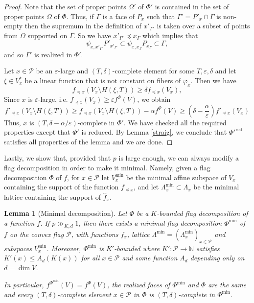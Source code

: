 \documentclass{daj}
\renewcommand{\le}{\leqslant}
\renewcommand{\ge}{\geqslant}
\newcommand{\N}{\mathbb N}
\renewcommand{\P}{\mathcal P}
\newtheorem{lemma}[theorem]{Lemma}
\theoremstyle{definition}
\theoremstyle{remark}
\theoremstyle{definition}
\theoremstyle{definition}
\begin{document}
\begin{proof}
Note that the set of proper points $\Omega'$ of $\Phi'$ is contained in the set of proper points $\Omega$ of $\Phi$. Thus, if $\Gamma$ is a face of $P_x$ such that $\Gamma' = P'_x \cap \Gamma$ is non-empty then the supremum in the definition of $x'_{\Gamma'}$ is taken over a subset of points from $\Omega$ supported on  $\Gamma$. So we have $x'_{\Gamma'} \preceq x_\Gamma$ which implies that
$$
\psi_{x, x'_{\Gamma'}} P'_{x'_{\Gamma'}} \subset \psi_{x, x_\Gamma} P_{x_\Gamma} \subset \Gamma,
$$
and so $\Gamma'$ is realized in $\Phi'$. 

Let $x \in \P$ be an $\varepsilon$-large and $(T, \delta)$-complete element for some $T,\varepsilon, \delta$ and let $\xi \in V_x^*$ be a linear function that is not constant on fibers of $\varphi_x$. Then we have 
$$
f_{\preceq x}(V_x \setminus H(\xi, T)) \ge \delta f_{\preceq x}(V_x),
$$
Since $x$ is $\varepsilon$-large, i.e. $f_{\preceq x}(V_x) \ge \varepsilon f^\Phi(V)$, we obtain
$$
f'_{\preceq x}(V_x \setminus H(\xi, T)) \ge f_{\preceq x}(V_x \setminus H(\xi, T)) - \alpha f^\Phi(V) \ge \left(\delta - \frac{\alpha}{\varepsilon}\right) f'_{\preceq x}(V_x)
$$
Thus, $x$ is $(T, \delta - \alpha/\varepsilon)$-complete in $\Phi'$. We have checked all the required properties except that $\Phi'$ is reduced. By Lemma \ref{straig}, we conclude that $\Phi'^{\text{red}}$ satisfies all properties of the lemma and we are done.
\end{proof}

Lastly, we show that, provided that $p$ is large enough, we can always modify a flag decomposition in order to make it minimal. Namely, given a flag decomposition $\Phi$ of $f$, for $x \in \P$ let $V_x^{\text{min}}$ be the minimal affine subspace of $V_x$ containing the support of the function $f_{\preceq x}$, and let $\Lambda_x^{\text{min}} \subset \Lambda_x$ be the minimal lattice containing the support of $\hat f_x$.

\begin{lemma}[Minimal decomposition]\label{minlat}
Let $\Phi$ be a $K$-bounded flag decomposition of a function $f$. If $p \gg_{K, d}1$, then there exists a minimal flag decomposition $\Phi^{\text{min}}$ of $f$ on the convex flag $\P$, with functions $f_x$, lattice $\Lambda^{\text{min}} = (\Lambda_x^{\text{min}})_{x\in\P}$ and subspaces $V_x^{\text{min}}$. Moreover, $\Phi^{\text{min}}$ is $K'$-bounded where $K': \P\rightarrow \N$ satisfies $K'(x) \le A_d(K(x))$ for all $x \in \P$ and some function $A_d$ depending only on $d = \dim V$.

In particular, $f^{\Phi^{\text{min}}}(V) = f^{\Phi}(V)$, the realized faces of $\Phi^{\text{min}}$ and $\Phi$ are the same and every $(T, \delta)$-complete element $x \in \P$ in $\Phi$ is $(T, \delta)$-complete in $\Phi^{\text{min}}$.
\end{lemma}
\end{document}
